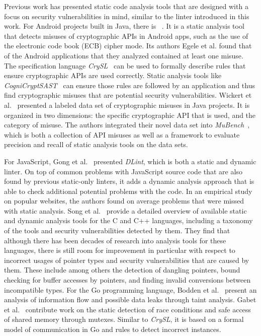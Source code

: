 Previous work has presented static code analysis tools that are designed with a focus on security vulnerabilities in
mind, similar to the \toolSafer{} linter introduced in this work.
For Android projects built in Java, there is \toolCryptolint{}~\cite{egele2013}.
It is a static analysis tool that detects misuses of cryptographic \acrshort{API}s in Android apps, such as the use of
the electronic code book (\acrshort{ECB}) cipher mode.
Its authors Egele et al. found that  of the  Android applications that they analyzed
contained at least one misuse.
The specification language \textit{CrySL}~\cite{kruger2018} can be used to formally describe rules that ensure
cryptographic \acrshort{API}s are used correctly.
Static analysis tools like \textit{CogniCryptSAST}~\cite{kruger2017} can ensure those rules are followed by an
application and thus find cryptographic misuses that are potential security vulnerabilities.
Wickert et al.~\cite{wickert2019} presented a labeled data set of  cryptographic misuses in Java projects.
It is organized in two dimensions: the specific cryptographic \acrshort{API} that is used, and the category of misuse.
The authors integrated their novel data set into \textit{MuBench}~\cite{amann2016}, which is both a collection of
\acrshort{API} misuses as well as a framework to evaluate precision and recall of static analysis tools on the data
sets.

For JavaScript, Gong et al.~\cite{gong2015} presented \textit{DLint}, which is both a static and dynamic linter.
On top of common problems with JavaScript source code that are also found by previous static-only linters, it adds a
dynamic analysis approach that is able to check  additional potential problems with the code.
In an empirical study on  popular websites, the authors found on average  problems
that were missed with static analysis.
Song et al.~\cite{song2019} provide a detailed overview of available static and dynamic analysis tools for the C and C++
languages, including a taxonomy of the tools and security vulnerabilities detected by them.
They find that although there has been decades of research into analysis tools for these languages, there is still room
for improvement in particular with respect to incorrect usages of pointer types and security vulnerabilities that are
caused by them.
These include among others the detection of dangling pointers, bound checking for buffer accesses by pointers, and
finding invalid conversions between incompatible types.
For the Go programming language, Bodden et al.~\cite{bodden2016} present an analysis of information flow and possible
data leaks through taint analysis.
Gabet et al.~\cite{gabet2020} contribute work on the static detection of race conditions and safe access of shared
memory through mutexes.
Similar to \textit{CrySL}, it is based on a formal model of communication in Go and rules to detect incorrect instances.


